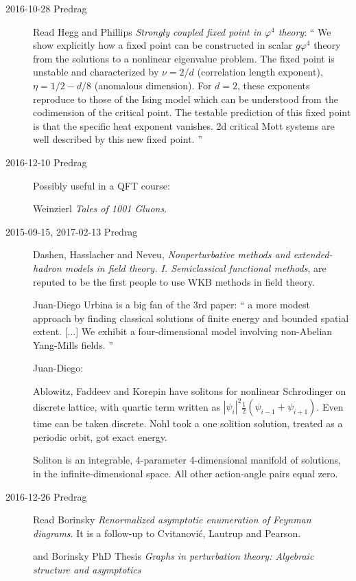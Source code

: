 \begin{description}
\item[2016-10-28 Predrag]
Read Hegg and Phillips
{\em Strongly coupled fixed point in {$\varphi^4$} theory}: `` We show
explicitly how a fixed point can be constructed in scalar {$g\varphi^4$}
theory from the solutions to a nonlinear eigenvalue problem. The fixed
point is unstable and characterized by {$\nu=2/d$} (correlation length
exponent), {$\eta=1/2-d/8$} (anomalous dimension). For $d=2$, these
exponents reproduce to those of the Ising model which can be understood
from the codimension of the critical point. The testable prediction of
this fixed point is that the specific heat exponent vanishes. 2d critical
Mott systems are well described by this new fixed point. ''

\item[2016-12-10 Predrag] Possibly useful in a QFT course:

Weinzierl {\em Tales of 1001 Gluons}.

\item[2015-09-15, 2017-02-13 Predrag]
Dashen, Hasslacher and Neveu,
\emph{Nonperturbative methods and extended-hadron models in field theory.
{I}. {Semiclassical} functional methods},
are reputed to be the first people to use WKB methods in field theory.


Juan-Diego Urbina is a big fan of the 3rd paper:
``
a more modest approach by finding classical
solutions of finite energy and bounded spatial extent.
[...]
We exhibit a four-dimensional model involving non-Abelian Yang-Mills fields.
''

Juan-Diego:

Ablowitz, Faddeev and Korepin have solitons for nonlinear Schrodinger on discrete
lattice, with quartic term written as
$|\psi_i|^2\frac{1}{2}(\psi_{i-1}+\psi_{i+1})$. Even time can be taken
discrete. Nohl took a one solition solution, treated as a periodic
orbit, got exact energy.

Soliton is an integrable, 4-parameter 4-dimensional manifold of solutions, in the
infinite-dimensional space. All other action-angle pairs equal zero.

\item[2016-12-26 Predrag] Read
Borinsky
{\em Renormalized asymptotic enumeration of {Feynman} diagrams}.
It is a follow-up to Cvitanovi\'c, Lautrup and Pearson.

and Borinsky PhD Thesis
{\em Graphs in perturbation theory: {Algebraic} structure and asymptotics}


\end{description}
